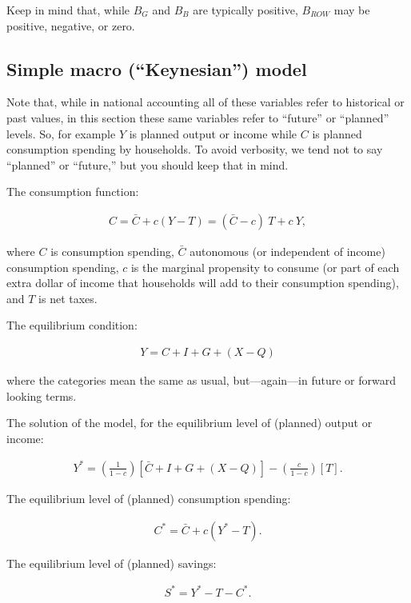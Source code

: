 \documentclass[12pt]{article}
\begin{document}
Keep in mind that, while $B_G$ and $B_B$ are typically positive, $B_{ROW}$ may be positive, negative, or zero.

\subsection*{Simple macro (``Keynesian'') model}

Note that, while in national accounting all of these variables refer to historical or past values, in this section these same variables refer to ``future'' or ``planned'' levels.  So, for example $Y$ is planned output or income while $C$ is planned consumption spending by households.  To avoid verbosity, we tend not to say ``planned'' or ``future,'' but you should keep that in mind.

The consumption function:

\begin{eqnarray} C = \bar{C} + c (Y - T) = (\bar{C} - c) \ T + c \ Y, \end{eqnarray}

\noindent where $C$ is consumption spending, $\bar{C}$ autonomous (or independent of income) consumption spending, $c$ is the marginal propensity to consume (or part of each extra dollar of income that households will add to their consumption spending), and $T$ is net taxes.

The equilibrium condition:

\begin{eqnarray} Y = C + I + G + (X-Q)\end{eqnarray}

\noindent where the categories mean the same as usual, but---again---in future or forward looking terms.

The solution of the model, for the equilibrium level of (planned) output or income:

\begin{eqnarray} Y^* =  \left( \frac{1}{1 - c} \right) [\bar{C} + I + G + (X-Q)] - \left( \frac{c}{1 - c} \right) [T]. \end{eqnarray}

The equilibrium level of (planned) consumption spending:

\begin{eqnarray} C^* =  \bar{C} + c (Y^* - T). \end{eqnarray}

The equilibrium level of (planned) savings:

\begin{eqnarray} S^* =  Y^* - T - C^*. \end{eqnarray}
\end{document}
